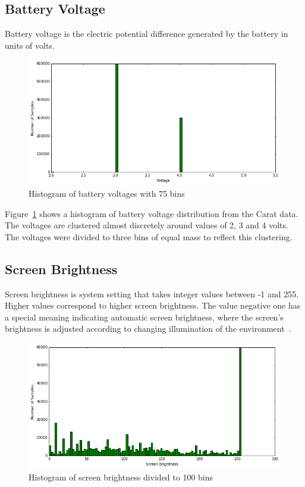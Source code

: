 \subsection{Battery Voltage}  

Battery voltage is the electric potential difference generated by the battery in units of volts.

\begin{figure}[!htbp]
	\centering
	\includegraphics[width=\textwidth]{images/carat-data/battery_voltage.png}
	\caption{Histogram of battery voltages with 75 bins}
	\label{figure:carat-data-battery-voltage}
\end{figure}  

Figure~\ref{figure:carat-data-battery-voltage} shows a histogram of battery voltage distribution from the Carat data. The voltages are clustered almost discretely around values of 2, 3 and 4 volts. The voltages were divided to three bins of equal mass to reflect this clustering.    

\subsection{Screen Brightness}  

Screen brightness is system setting that takes integer values between -1 and 255. Higher values correspond to higher screen brightness. The value negative one has a special meaning indicating automatic screen brightness, where the screen's brightness is adjusted according to changing illumination of the environment~\cite{PELTONEN201671}.

\begin{figure}[!htbp]
	\centering
	\includegraphics[width=\textwidth]{images/carat-data/screen_brightness.png}
	\caption{Histogram of screen brightness divided to 100 bins}
	\label{figure:carat-data-screen-brightness}
\end{figure}    

